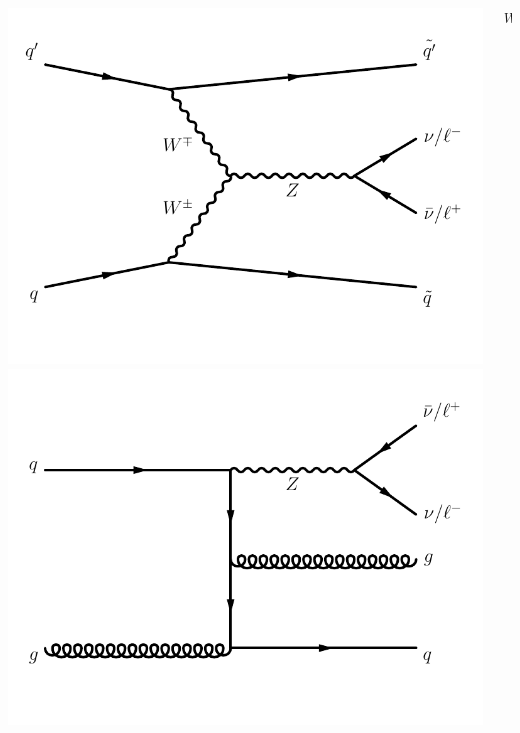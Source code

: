 \documentclass[aspectratio=169,xcolor=dvipsnames,,table,compress]{beamer}
\begin{document}
\begin{frame}
\begin{columns}[T]
\begin{column}{0.33\textwidth}
      \includegraphics[width=\textwidth]{../figures/vbf/diagrams/vbf_z.pdf} \\
      \includegraphics[width=\textwidth]{../figures/vbf/diagrams/qcd_z.pdf} 
    \end{column}
    \begin{column}{0.33\textwidth}
      \centering 
      $W$ \\

\end{column}
\end{columns}
\end{frame}
\end{document}
